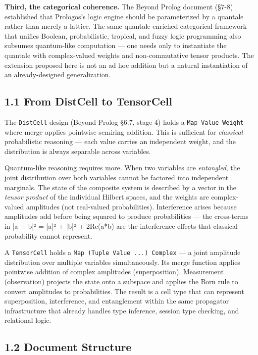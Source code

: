 \documentclass[11pt]{article}
\begin{document}
\textbf{Third, the categorical coherence.} The Beyond Prolog document (§7-8) established
that Prologos's logic engine should be parameterized by a quantale rather than
merely a lattice. The same quantale-enriched categorical framework that unifies
Boolean, probabilistic, tropical, and fuzzy logic programming also subsumes
quantum-like computation --- one needs only to instantiate the quantale with
complex-valued weights and non-commutative tensor products. The extension proposed
here is not an ad hoc addition but a natural instantiation of an already-designed
generalization.
\subsection{1.1 From DistCell to TensorCell}
\label{sec:org93a2973}

The \texttt{DistCell} design (Beyond Prolog §6.7, stage 4) holds a \texttt{Map Value Weight}
where merge applies pointwise semiring addition. This is sufficient for
\emph{classical} probabilistic reasoning --- each value carries an independent weight,
and the distribution is always separable across variables.

Quantum-like reasoning requires more. When two variables are \emph{entangled}, the
joint distribution over both variables cannot be factored into independent
marginals. The state of the composite system is described by a vector in the
\emph{tensor product} of the individual Hilbert spaces, and the weights are
complex-valued amplitudes (not real-valued probabilities). Interference arises
because amplitudes add before being squared to produce probabilities --- the
cross-terms in |a + b|² = |a|² + |b|² + 2Re(a*b) are the interference effects
that classical probability cannot represent.

A \texttt{TensorCell} holds a \texttt{Map (Tuple Value ...) Complex} --- a joint amplitude
distribution over multiple variables simultaneously. Its merge function applies
pointwise addition of complex amplitudes (superposition). Measurement (observation)
projects the state onto a subspace and applies the Born rule to convert amplitudes
to probabilities. The result is a cell type that can represent superposition,
interference, and entanglement within the same propagator infrastructure that
already handles type inference, session type checking, and relational logic.
\subsection{1.2 Document Structure}
\label{sec:orgf2be465}
\end{document}
